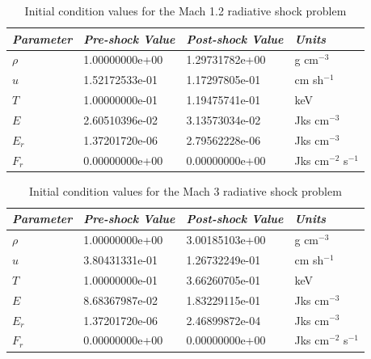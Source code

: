 \documentclass[preprint,12pt]{elsarticle}
\begin{document}
\begin{table}[ht]
  \centering
  \caption{Initial condition values for the Mach 1.2 radiative shock problem}
  \label{tab:mach1.2_shock_IC}
  \begin{tabular}{l l l l}\hline
      \emph{Parameter} & \emph{Pre-shock Value} & \emph{Post-shock Value} & \emph{Units}\\\hline
$\rho$ & 1.00000000e+00 & 1.29731782e+00 & g cm$^{-3}$ \\
$u$ & 1.52172533e-01 & 1.17297805e-01 & cm sh$^{-1}$ \\
$T$ & 1.00000000e-01 & 1.19475741e-01 & keV \\
$E$ & 2.60510396e-02 & 3.13573034e-02 & Jks cm$^{-3}$\\
$E_r$ & 1.37201720e-06 & 2.79562228e-06 & Jks cm$^{-3}$ \\
$F_r$ & 0.00000000e+00 & 0.00000000e+00 & Jks cm$^{-2}$ s$^{-1}$ \\
      \hline
  \end{tabular}
\end{table}
\begin{table}[ht]
  \centering
  \caption{Initial condition values for the Mach 3 radiative shock problem}
  \label{tab:mach3_shock_IC}
  \begin{tabular}{l l l l}\hline
      \emph{Parameter} & \emph{Pre-shock Value} & \emph{Post-shock Value} & \emph{Units}\\\hline
$\rho$ & 1.00000000e+00 & 3.00185103e+00 & g cm$^{-3}$ \\
$u$ & 3.80431331e-01 & 1.26732249e-01 & cm sh$^{-1}$ \\
$T$ & 1.00000000e-01 & 3.66260705e-01 & keV \\
$E$ & 8.68367987e-02 & 1.83229115e-01 & Jks cm$^{-3}$\\
$E_r$ & 1.37201720e-06 & 2.46899872e-04 & Jks cm$^{-3}$ \\
$F_r$ & 0.00000000e+00 & 0.00000000e+00 & Jks cm$^{-2}$ s$^{-1}$ \\
      \hline 
  \end{tabular}
\end{table}
\end{document}
